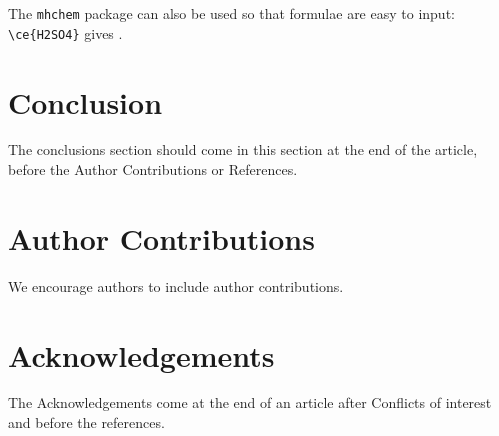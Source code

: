 \documentclass[twoside,twocolumn,9pt]{article}
\begin{document}
The \texttt{mhchem} package can also be used so that formulae are easy to input: \texttt{\textbackslash ce\{H2SO4\}} gives . 

\section{Conclusion}
The conclusions section should come in this section at the end of the article, before the Author Contributions or References.

\section*{Author Contributions}
We encourage authors to include author contributions. 

\section*{Acknowledgements}
The Acknowledgements come at the end of an article after Conflicts of interest and before the references.





\printbibliography %
\end{document}

